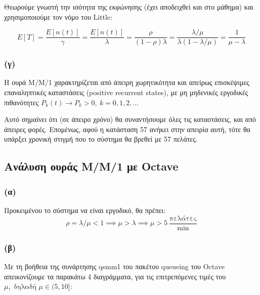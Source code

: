 \documentclass[a4paper]{article}
\begin{document}
Θεωρούμε γνωστή την ισότητα της εκφώνησης (έχει αποδειχθεί και στο μάθημα) και χρησιμοποιούμε τον νόμο του Little:

\[
	E[T]=\frac{E[n(t)]}{γ} = \frac{E[n(t)]}{λ} = \frac{ρ}{(1-ρ)λ} = \frac{λ/μ}{λ(1-λ/μ)} = \frac{1}{μ-λ}
\]
\subsubsection*{(γ)}

Η ουρά Μ/Μ/1 χαρακτηρίζεται από άπειρη χωρητικότητα και απείρως επισκέψιμες επαναληπτικές καταστάσεις (positive recurrent states), με μη μηδενικές εργοδικές πιθανότητες $ P_k(t) \to P_k > 0, \ k=0,1,2,...$ 

Αυτό σημαίνει ότι (σε άπειρο χρόνο) θα συναντήσουμε όλες τις καταστάσεις, και από άπειρες φορές. Επομένως, αφού η κατάσταση 57 ανήκει στην απειρία αυτή, τότε θα υπάρξει χρονική στιγμή που το σύστημα θα βρεθεί με 57 πελάτες.

\subsection*{Ανάλυση ουράς Μ/Μ/1 με Octave}

\subsubsection*{(α)}

Προκειμένου το σύστημα να είναι εργοδικό, θα πρέπει: 
\[ 
	ρ = λ/μ < 1 \implies μ > λ \implies μ > 5 \ \frac{\text{πελάτες}}{\text{min}}
\]
\subsubsection*{(β)}

Με τη βοήθεια της συνάρτησης qsmm1 του πακέτου queueing του Octave απεικονίζουμε τα παρακάτω 4 διαγράμματα, για τις επιτρεπόμενες τιμές του $ μ, \text{ δηλαδή } μ \in(5,10]$:
\end{document}
